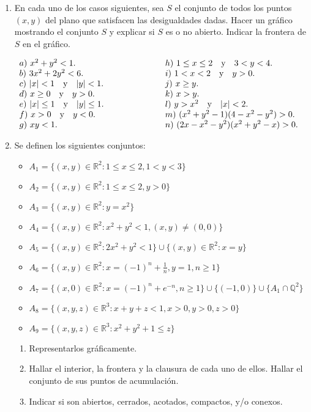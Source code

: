 \documentclass[11pt]{article}
\newcommand{\R}{\mathbb{R}}
\begin{document}
\begin{enumerate}
\item En cada      uno de los 
      casos siguientes, sea $S$ el conjunto de todos los puntos
      $(x,y)$ del plano que satisfacen las desigualdades dadas. Hacer
      un gr\'afico mostrando el conjunto $S$ y explicar si $S$ es o no abierto. Indicar la frontera
      de $S$ en el gr\'afico.
      \begin{flushleft}$  
      \begin{array}{lll}
      a)\ x^2+y^2<1. &\hspace{12ex} & h)\ 1\leq x\leq 2 \ \ \textrm{ y
      }\ \  3<y<4.\\ 
      b)\ 3x^2+2y^2<6.& & i)\ 1<x<2 \ \ \textrm{ y }\ \  y>0.\\
      c)\ |x|<1\ \ \textrm{ y }\ \ |y|<1.& & j)\ x\geq y.\\
      d)\ x\geq 0\ \ \textrm{ y }\ \ y>0.& & k)\ x>y.\\
      e)\ |x|\leq 1\ \ \textrm{ y }\ \ |y|\leq 1.& & l)\ y>x^2\ \
        \textrm{ y }\ \ |x|<2.\\ 
      f)\ x>0\ \ \textrm{ y }\ \ y<0.& & m)\ (x^2+y^2-1)(4-x^2-y^2)>0.\\
      g)\ xy<1.& & n)\ (2x-x^2-y^2)(x^2+y^2-x)>0.\\
      \end{array}$\end{flushleft}

\newpage
\item  Se definen los siguientes conjuntos:
       \begin{itemize}
         \item[] $A_1=\{(x,y)\in \R^{2} \colon 1\leq x \leq 2 , 1<y<3 \}$ 
         \item[] $A_2 =\{(x,y)\in \R^{2} \colon 1\leq x \leq 2 , y>0 \}$ 
         \item[] $A_3 =\{(x,y)\in \R^{2} \colon y=x^2 \}$  
         \item[] $A_4 =\{(x,y)\in \R^{2} \colon x^2 +y^2 <1,(x,y)\neq
           (0,0) \}$  
         \item[] $A_5 =\{(x,y)\in \R^{2} \colon 2x^2 +y^2 <1 \} \cup
           \{ (x,y)\in \R^2 \colon x=y \}$  
         \item[] $A_6 =\{(x,y)\in \R^{2} \colon x=(-1)^n +\frac{1}{n},
           y=1 , n\geq 1 \}$  
         \item[] $A_7 =\{(x,0)\in \R^{2} \colon x=(-1)^n + e^{-n}
           ,n\geq 1 \} \cup \{(-1,0)\}\cup \{A_1\cap \mathbb{Q}^2 \}$  
         \item[] $A_8 =\{(x,y,z)\in \R^{3} \colon x+y+z<1,x>0,y>0,z>0
           \}$  
         \item[] $A_9 =\{(x,y,z)\in \R^{3} \colon x^2 +y^2 +1\leq z \}$ 
       \end{itemize}
       \begin{enumerate}
         \item Representarlos gr\'aficamente.
         \item Hallar el interior, la frontera y la clausura de cada uno de ellos. Hallar el conjunto de sus puntos de acumulaci\'on.
         \item Indicar si son abiertos, cerrados, acotados, compactos, y/o conexos. 
         

\end{enumerate}
\end{enumerate}
\end{document}
